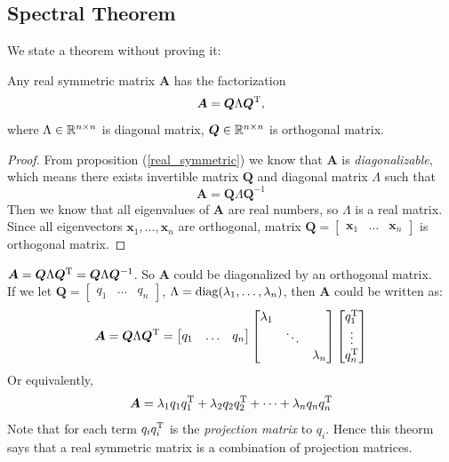 \subsection{Spectral Theorem}
We state a theorem without proving it:
\begin{theorem}
Any real symmetric matrix $\bm A$ has the factorization \begin{equation}
\bm A=\bm Q\Lambda\bm Q^{\mathrm T},
\end{equation} where $\Lambda\in\mathbb{R}^{n\times n}$ is diagonal matrix, $\bm Q\in\mathbb{R}^{n\times n}$ is orthogonal matrix.
\end{theorem}
\begin{proof}
From proposition (\ref{real_symmetric}) we know that $\bm A$ is \textit{diagonalizable}, which means there exists invertible matrix $\bm Q$ and diagonal matrix $\Lambda$ such that
\[
\bm A=\bm Q\Lambda\bm Q^{-1}
\]
Then we know that all eigenvalues of $\bm A$ are real numbers, so $\Lambda$ is a real matrix.\\
Since all eigenvectors $\bm x_1,\dots,\bm x_n$ are orthogonal, matrix $\bm Q=\begin{bmatrix}
\bm x_1&\dots&\bm x_n
\end{bmatrix}$ is orthogonal matrix.
\end{proof}
\begin{remark}
$\bm A=\bm Q\Lambda\bm Q^{\mathrm T}=\bm Q\Lambda\bm Q^{-1}$. So $\bm A$ could be diagonalized by an orthogonal matrix.\\
If we let $\bm Q=\begin{bmatrix}
q_1&\dots&q_n
\end{bmatrix}$, $\Lambda=\operatorname{diag}(\lambda_1,\dots,\lambda_n)$, then $\bm A$ could be written as:
\[
\bm A=\bm Q\Lambda\bm Q^{\mathrm T}=
\begin{bmatrix}
q_1&\dots&q_n
\end{bmatrix}\begin{bmatrix}
\lambda_1&&\\&\ddots&\\&&\lambda_n
\end{bmatrix}\begin{bmatrix}
q_1^{\mathrm T}\\\vdots\\q_n^{\mathrm T}
\end{bmatrix}
\]
Or equivalently,
\begin{equation}
\bm A=\lambda_1q_1q_1^{\mathrm T}+\lambda_2q_2q_2^{\mathrm T}+\dots+\lambda_nq_nq_n^{\mathrm T}
\end{equation}
Note that for each term $q_iq_i^{\mathrm T}$ is the \emph{projection matrix} to $q_i$. Hence this theorm says that a real symmetric matrix is a combination of projection matrices.
\end{remark}
